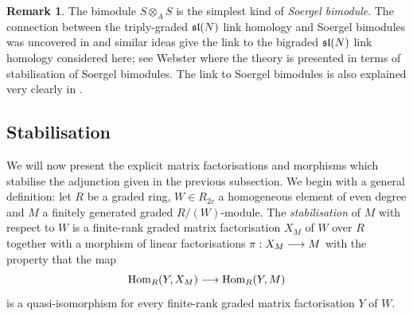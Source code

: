 \documentclass{compositio}
\theoremstyle{definition}
\newtheorem{remark}[theorem]{Remark}
\numberwithin{equation}{section}
\def\Hom{\operatorname{Hom}}
\begin{document}
\begin{remark} The bimodule $S \otimes_A S$ is the simplest kind of \emph{Soergel bimodule}. The connection between the triply-graded $\mathfrak{sl}(N)$ link homology and Soergel bimodules was uncovered in \cite{k0510265} and similar ideas give the link to the bigraded $\mathfrak{sl}(N)$ link homology considered here; see Webster \cite[Section 2.3]{w0610650} where the theory is presented in terms of stabilisation of Soergel bimodules. The link to Soergel bimodules is also explained very clearly in \cite{b1105.0702}.
\end{remark}


\subsection{Stabilisation}\label{section:stabilisation}

We will now present the explicit matrix factorisations and morphisms which stabilise the adjunction given in the previous subsection. We begin with a general definition: let $R$ be a graded ring, $W \in R_{2c}$ a homogeneous element of even degree and $M$ a finitely generated graded $R/(W)$-module. The \emph{stabilisation} of $M$ with respect to $W$ is a finite-rank graded matrix factorisation $X_M$ of $W$ over $R$ together with a morphism of linear factorisations $\pi: X_M \longrightarrow M$ with the property that the map
\[
\Hom_R(Y, X_M) \lto \Hom_R(Y, M)
\]
is a quasi-isomorphism for every finite-rank graded matrix factorisation $Y$ of $W$.

\end{document}
